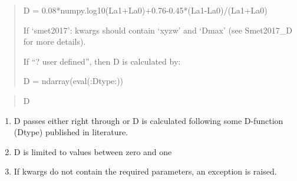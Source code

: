 \documentclass[letterpaper,10pt,english]{sphinxmanual}
\begin{document}
\begin{fulllineitems}
\begin{description}
\begin{quote}
\begin{description}
\begin{DUlineblock}{0em}
\begin{DUlineblock}{\DUlineblockindent}
\begin{DUlineblock}{\DUlineblockindent}
\item[] D = 0.08*numpy.log10(La1+La0)+0.76-0.45*(La1-La0)/(La1+La0)
\end{DUlineblock}
\end{DUlineblock}
\item[] If ‘smet2017’: kwargs should contain ‘xyzw’ and ‘Dmax’
(see Smet2017\_D for more details).
\item[] If “? user defined”, then D is calculated by:
\item[]
\begin{DUlineblock}{\DUlineblockindent}
\item[] D = ndarray(eval(:Dtype:))  
\end{DUlineblock}
\end{DUlineblock}

\end{description}\end{quote}

\item[{Returns:}] \leavevmode\begin{quote}\begin{description}
\item[{D}] \leavevmode
{}

\end{description}\end{quote}

\item[{Notes:}] \leavevmode\begin{enumerate}
\item {} 
D passes either right through or D is calculated following some 
D-function (Dtype) published in literature.

\item {} 
D is limited to values between zero and one

\item {} 
If kwargs do not contain the required parameters, 
an exception is raised.

\end{enumerate}

\end{description}

\end{fulllineitems}

\end{document}
